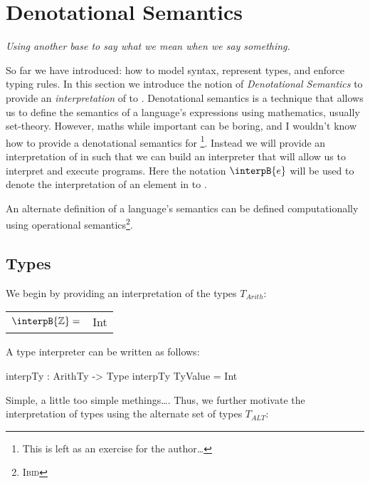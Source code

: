 \section{Denotational Semantics}
\label{sec:denote}

\begin{center}\large\em
Using another base to say what we mean when we say something.
\end{center}

\noindent
So far we have introduced: how to model syntax, represent types, and enforce typing rules.
In this section we introduce the notion of \emph{Denotational Semantics} to provide an \emph{interpretation} of \allang{} to \idris{}.
Denotational semantics is a technique that allows us to define the semantics of a language's expressions using mathematics, usually set-theory.
However, maths while important can be boring, and I wouldn't know how to provide a denotational semantics for \allang{}\footnote{This is left as an exercise for the author\ldots}.
Instead  we will provide an interpretation of \allang{} in \idris{} such that we can build an interpreter that will allow us to interpret and execute \allang{} programs.
Here the notation $\interpB{e}$ will be used to denote the interpretation of an element in \allang{} to \idris{}.

An alternate definition of a language's semantics can be defined computationally using operational semantics\footnote{\textsc{Ibid}}.


\subsection{Types}
\label{sec:denote:types}

We begin by providing an interpretation of the types $T_{Arith}$:

\begin{center}
\begin{tabularx}{0.8\textwidth}{>{$}r<{$}>{\ttfamily}X}
\interpB{\mathbb{Z}}=& Int \\
\end{tabularx}
\end{center}

\noindent
A type interpreter can be written as follows:

\begin{code}
interpTy : ArithTy -> Type
interpTy TyValue = Int
\end{code}

\noindent
Simple, a little too simple methings\ldots.
Thus, we further motivate the interpretation of types using the alternate set of types $T_{ALT}$:

